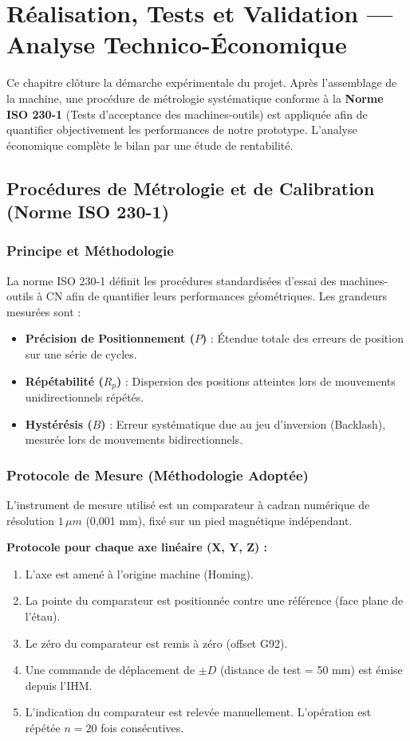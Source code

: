 \chapter[Réalisation, Tests et Validation]{Réalisation, Tests et Validation — Analyse Technico-Économique}
\label{chap:tests}

Ce chapitre clôture la démarche expérimentale du projet. Après l'assemblage de la machine, une procédure de métrologie systématique conforme à la \textbf{Norme ISO 230-1} (Tests d'acceptance des machines-outils) est appliquée afin de quantifier objectivement les performances de notre prototype. L'analyse économique complète le bilan par une étude de rentabilité.

\section{Procédures de Métrologie et de Calibration (Norme ISO 230-1)}

\subsection{Principe et Méthodologie}
La norme ISO 230-1 définit les procédures standardisées d'essai des machines-outils à CN afin de quantifier leurs performances géométriques. Les grandeurs mesurées sont :
\begin{itemize}
    \item \textbf{Précision de Positionnement ($P$)} : Étendue totale des erreurs de position sur une série de cycles.
    \item \textbf{Répétabilité ($R_p$)} : Dispersion des positions atteintes lors de mouvements unidirectionnels répétés.
    \item \textbf{Hystérésis ($B$)} : Erreur systématique due au jeu d'inversion (Backlash), mesurée lors de mouvements bidirectionnels.
\end{itemize}

\subsection{Protocole de Mesure (Méthodologie Adoptée)}
L'instrument de mesure utilisé est un comparateur à cadran numérique de résolution $1\,\mu m$ (0{,}001 mm), fixé sur un pied magnétique indépendant.

\textbf{Protocole pour chaque axe linéaire (X, Y, Z) :}
\begin{enumerate}
    \item L'axe est amené à l'origine machine (Homing).
    \item La pointe du comparateur est positionnée contre une référence (face plane de l'étau).
    \item Le zéro du comparateur est remis à zéro (offset G92).
    \item Une commande de déplacement de $\pm D$ (distance de test = 50 mm) est émise depuis l'IHM.
    \item L'indication du comparateur est relevée manuellement. L'opération est répétée $n = 20$ fois consécutives.
\end{enumerate}

